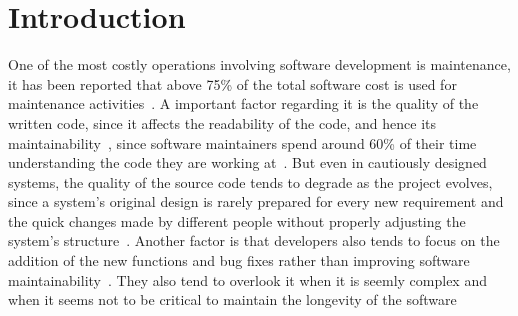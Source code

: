 \section{Introduction}

%
%
%
%
%


One of the most costly operations involving software development is maintenance, it has been reported that above 75\% of the total software cost is used for maintenance activities~\citep{bennett2000software, liu2012schedule}. A important factor regarding it is the quality of the written code, since it affects the readability of the code, and hence its maintainability~\citep{aggarwal2002integrated}, since software maintainers spend around 60\% of their time understanding the code they are working at~\citep{abran1993measurement}. But even in cautiously designed systems, the quality of the source code tends to degrade as the project evolves, since a system’s original design is rarely prepared for every new requirement and the quick changes made by different people without properly adjusting the system’s structure~\citep{seng2006search}. Another factor is that developers also tends to focus on the addition of the new functions and bug fixes rather than improving software maintainability~\citep{tufano2015and}.  They also tend to overlook it when it is seemly complex and when it seems not to be critical to maintain the longevity of the software~\citep{murphy2012we}

